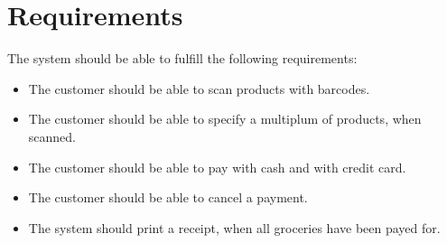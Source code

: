 \chapter{Requirements}
The system should be able to fulfill the following requirements:

\begin{itemize}
\item The customer should be able to scan products with barcodes.
\item The customer should be able to specify a multiplum of products, when scanned.
\item The customer should be able to pay with cash and with credit card.
\item The customer should be able to cancel a payment.
\item The system should print a receipt, when all groceries have been payed for.
\end{itemize}